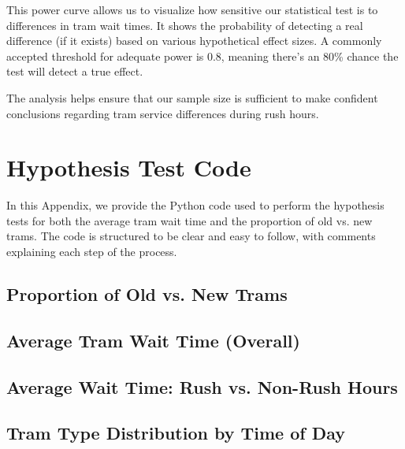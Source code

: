 \documentclass[a4paper, 10pt]{article}
\begin{document}
\begin{appendices}
				This power curve allows us to visualize how sensitive our statistical test is to differences in tram wait times. It shows the probability of detecting a real difference (if it exists) based on various hypothetical effect sizes. A commonly accepted threshold for adequate power is 0.8, meaning there's an 80\% chance the test will detect a true effect.

				\bigskip
				The analysis helps ensure that our sample size is sufficient to make confident conclusions regarding tram service differences during rush hours.
		

		\newpage
		\section{Hypothesis Test Code}
		\label{sec:hypothesis_test_code}
		  \noindent In this Appendix, we provide the Python code used to perform the hypothesis tests for both the average tram wait time and the proportion of old vs. new trams. The code is structured to be clear and easy to follow, with comments explaining each step of the process.

			\subsection*{Proportion of Old vs. New Trams}
					

			\newpage
			\subsection*{Average Tram Wait Time (Overall)}
				

			\newpage
			\subsection*{Average Wait Time: Rush vs. Non-Rush Hours}
				

			\newpage
			\subsection*{Tram Type Distribution by Time of Day}
				
	\end{appendices}
\end{document}
